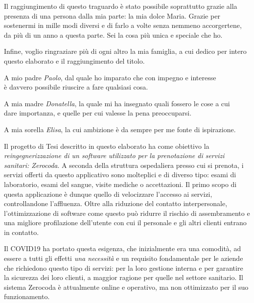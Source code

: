 \documentclass[
    corpo=11pt,
    twoside,
]{toptesi}
\begin{document}
Il raggiungimento di questo traguardo è stato possibile soprattutto grazie alla presenza di una persona dalla mia parte: la mia dolce Maria. Grazie per sostenermi in mille modi diversi e di farlo a volte senza nemmeno accorgertene, da più di un anno a questa parte. Sei la cosa più unica e speciale che ho. 

Infine, voglio ringraziare più di ogni altro la mia famiglia, a cui dedico per intero questo elaborato e il raggiungimento del titolo.
\begin{center}
  \noindent
  A mio padre \emph{Paolo}, dal quale ho imparato che con impegno e interesse \\è davvero possibile riuscire a fare qualsiasi cosa.
  \vspace{1px}
\end{center}
\begin{center}
  \noindent
  A mia madre \emph{Donatella}, la quale mi ha insegnato quali fossero le cose a cui \\dare importanza, e quelle per cui valesse la pena preoccuparsi.
  \vspace{1px}
\end{center}
\begin{center}
  \noindent
  A mia sorella \emph{Elisa}, la cui ambizione è da sempre per me fonte di ispirazione. 
\end{center}


\sommario %
Il progetto di Tesi descritto in questo elaborato ha come obiettivo la \emph{reingegnerizzazione di un software utilizzato per la prenotazione di servizi sanitari: Zerocoda}. A seconda della struttura ospedaliera presso cui si prenota, i servizi offerti da questo applicativo sono molteplici e di diverso tipo: esami di laboratorio, esami del sangue, visite mediche o accettazioni. Il primo scopo di questa applicazione è dunque quello di velocizzare l'accesso ai servizi, controllandone l'affluenza. Oltre alla riduzione del contatto interpersonale, l'ottimizzazione di software come questo può ridurre il rischio di assembramento e una migliore profilazione dell'utente con cui il personale e gli altri clienti entrano in contatto.

Il COVID19 ha portato questa esigenza, che inizialmente era una comodità, ad essere a tutti gli effetti \textit{una necessità} e un requisito fondamentale per le aziende che richiedono questo tipo di servizi: per la loro gestione interna e per garantire la sicurezza dei loro clienti, a maggior ragione per quelle nel settore sanitario. Il sistema Zerocoda è attualmente online e operativo, ma non ottimizzato per il suo funzionamento.
\end{document}
